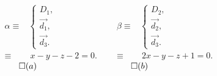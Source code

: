 \documentclass[10pt]{beamer}
\newcommand{\vect}[1] {
  \overrightarrow{#1}}
\begin{document}
{\begin{columns}[c]
		\begin{align*}
		\alpha \equiv& \begin{cases}
		                D_1, \\
		                \vect{d_1}, \\
		                \vect{d_3}.
		               \end{cases} \\
		       \equiv&\ x-y-z-2=0.
		\end{align*} \hfill $\qed(a)$
		
		\begin{align*}
		\beta \equiv& \begin{cases}
		                D_2, \\
		                \vect{d_2}, \\
		                \vect{d_3}.
		               \end{cases} \\
		       \equiv&\ 2x-y-z+1=0.
		\end{align*} \hfill $\qed(b)$
		
		\end{columns}	\hfill
    }
\end{document}
